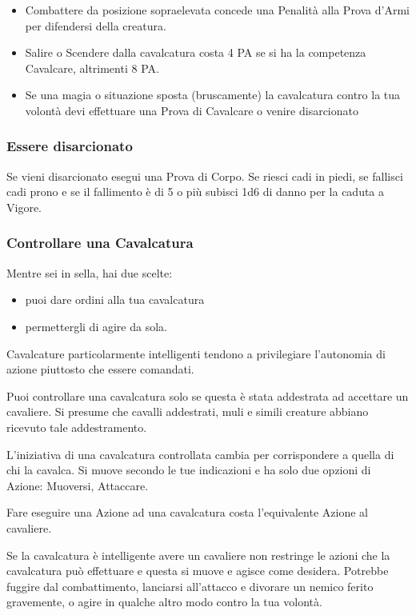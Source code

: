 \documentclass[12pt,a4paper,twoside,openany]{book}
\begin{document}
\begin{multicols}{2}
\begin{itemize}
Se la cavalcatura è da "guerra" (addestrata al combattimento) la Prova 2 Bonus.

\item
Combattere da posizione sopraelevata concede una Penalità alla Prova d'Armi per difendersi della creatura.

\item
Salire o Scendere dalla cavalcatura costa 4 PA se si ha la competenza Cavalcare, altrimenti 8 PA.

\item
Se una magia o situazione sposta (bruscamente) la cavalcatura contro la tua volontà devi effettuare una Prova di Cavalcare o venire disarcionato
\end{itemize}


\subsubsection{Essere disarcionato}\label{esseredisarcionato}

Se vieni disarcionato esegui una Prova di Corpo. Se riesci cadi in piedi, se fallisci cadi prono e se il fallimento è di 5 o più subisci 1d6 di danno per la caduta a Vigore.


\subsubsection{Controllare una Cavalcatura}\label{controllocavalcatura}

Mentre sei in sella, hai due scelte:

\begin{itemize}
\item puoi dare ordini alla tua cavalcatura
\item permettergli di agire da sola.
\end{itemize}

Cavalcature particolarmente intelligenti tendono a privilegiare l'autonomia di azione piuttosto che essere comandati.

Puoi controllare una cavalcatura solo se questa è stata addestrata ad accettare un cavaliere. Si presume che cavalli addestrati, muli e simili creature abbiano ricevuto tale addestramento.

L'iniziativa di una cavalcatura controllata cambia per corrispondere a quella di chi la cavalca. Si muove secondo le tue indicazioni e ha solo due opzioni di Azione: Muoversi, Attaccare.

Fare eseguire una Azione ad una cavalcatura costa l'equivalente Azione al cavaliere.

Se la cavalcatura è intelligente avere un cavaliere non restringe le azioni che la cavalcatura può effettuare e questa si muove e agisce come desidera. Potrebbe fuggire dal combattimento, lanciarsi all'attacco e divorare un nemico ferito gravemente, o agire in qualche altro modo contro la tua volontà.

\end{multicols}
\end{document}
